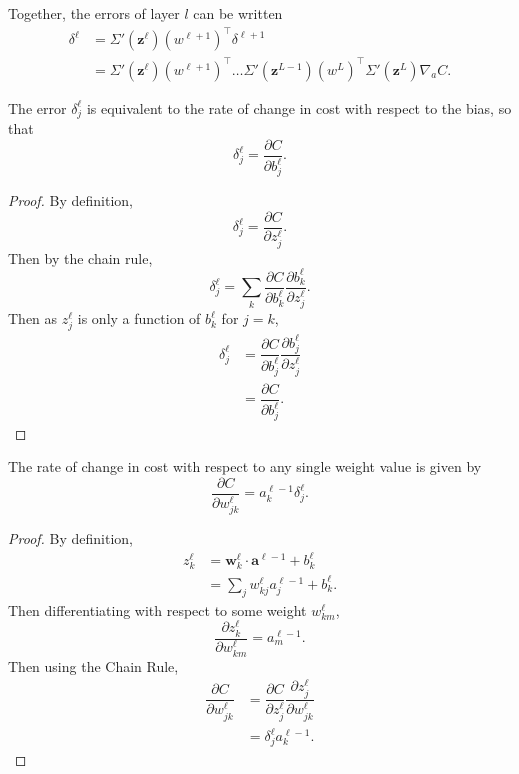 Together, the errors of layer $l$ can be written
\begin{align*}
	\delta^\ell & = \Sigma'(\mathbf{z}^\ell)(w^{\ell+1})^\intercal\delta^{\ell+1} \\
	& = \Sigma'(\mathbf{z}^\ell)(w^{\ell+1})^\intercal\ldots\Sigma'(\mathbf{z}^{L-1})(w^L)^\intercal\Sigma'(\mathbf{z}^L)\nabla_aC.
\end{align*}

\begin{proposition}
	The error $\delta_j^\ell$ is equivalent to the rate of change in cost with respect to the bias, so that
	\[
		\delta_j^\ell = \dfrac{\partial C}{\partial b_j^\ell}.
	\]
\end{proposition}
\begin{proof}
	By definition,
	\[
		\delta_j^\ell = \dfrac{\partial C}{\partial z_j^\ell}.
	\]
	Then by the chain rule,
	\[
		\delta_j^\ell = \sum_k\dfrac{\partial C}{\partial b_k^\ell}\dfrac{\partial b_k^\ell}{\partial z_j^\ell}.
	\]
	Then as $z_j^\ell$ is only a function of $b_k^\ell$ for $j = k$,
	\begin{align*}
		\delta_j^\ell & = \dfrac{\partial C}{\partial b_j^\ell}\dfrac{\partial b_j^\ell}{\partial z_j^\ell} \\
		& = \dfrac{\partial C}{\partial b_j^\ell}.
	\end{align*}
\end{proof}

\begin{proposition}
	The rate of change in cost with respect to any single weight value is given by
	\[
		\dfrac{\partial C}{\partial w_{jk}^\ell} = a_k^{\ell-1}\delta_j^\ell.
	\]
\end{proposition}
\begin{proof}
	By definition,
	\begin{align*}
		z_k^\ell & = \mathbf{w}_k^\ell\cdot\mathbf{a}^{\ell-1} + b_k^\ell \\
		& = \sum_jw_{kj}^\ell a_j^{\ell-1} + b_k^\ell.
	\end{align*}
	Then differentiating with respect to some weight $w_{km}^\ell$,
	\[
		\dfrac{\partial z_k^\ell}{\partial w_{km}^\ell} = a_m^{\ell-1}.
	\]
	Then using the Chain Rule,
	\begin{align*}	
		\dfrac{\partial C}{\partial w_{jk}^\ell} & = \dfrac{\partial C}{\partial z_j^\ell}\dfrac{\partial z_j^\ell}{\partial w_{jk}^\ell} \\
		& = \delta_j^\ell a_k^{\ell-1}.
	\end{align*}
\end{proof}


